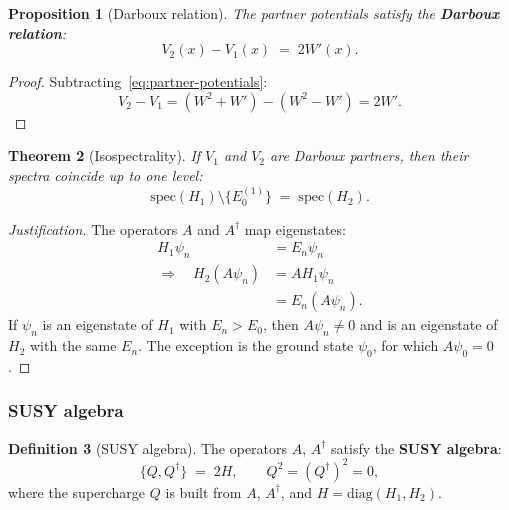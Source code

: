 \documentclass[11pt,a4paper]{article}
\newtheorem{theorem}{Theorem}[section]
\newtheorem{proposition}[theorem]{Proposition}
\theoremstyle{definition}
\newtheorem{definition}[theorem]{Definition}
\begin{document}
\begin{proposition}[Darboux relation]
\label{prop:darboux}
The partner potentials satisfy the \textbf{Darboux relation}:
\begin{equation}
    \boxed{
    V_2(x) - V_1(x) \;=\; 2 W'(x).
    }
    \label{eq:darboux-relation}
\end{equation}
\end{proposition}

\begin{proof}
Subtracting~\eqref{eq:partner-potentials}:
\begin{equation}
    V_2 - V_1 = (W^2 + W') - (W^2 - W') = 2 W'.
\end{equation}
\end{proof}

\begin{theorem}[Isospectrality]
\label{thm:isospectrality}
If $V_1$ and $V_2$ are Darboux partners, then their spectra
coincide up to one level:
\begin{equation}
    \mathrm{spec}(H_1) \setminus \{E_0^{(1)}\}
    \;=\; \mathrm{spec}(H_2).
    \label{eq:isospectrality}
\end{equation}
\end{theorem}

\begin{proof}[Justification]
The operators $A$ and $A^\dagger$ map eigenstates:
\begin{align}
    H_1 \psi_n &= E_n \psi_n \nonumber \\
    \Longrightarrow\quad
    H_2 (A \psi_n) &= A H_1 \psi_n \nonumber \\
    &= E_n (A \psi_n).
\end{align}
If $\psi_n$ is an eigenstate of $H_1$ with $E_n > E_0$,
then $A \psi_n \neq 0$ and is an eigenstate of $H_2$
with the same $E_n$. The exception is the ground state
$\psi_0$, for which $A \psi_0 = 0$.
\end{proof}

\subsubsection{SUSY algebra}

\begin{definition}[SUSY algebra]
\label{def:susy-algebra}
The operators $A$, $A^\dagger$ satisfy the \textbf{SUSY algebra}:
\begin{equation}
    \{Q, Q^\dagger\} \;=\; 2H, \qquad Q^2 = (Q^\dagger)^2 = 0,
    \label{eq:susy-algebra}
\end{equation}
where the supercharge $Q$ is built from $A$, $A^\dagger$,
and $H = \mathrm{diag}(H_1, H_2)$.
\end{definition}
\end{document}
